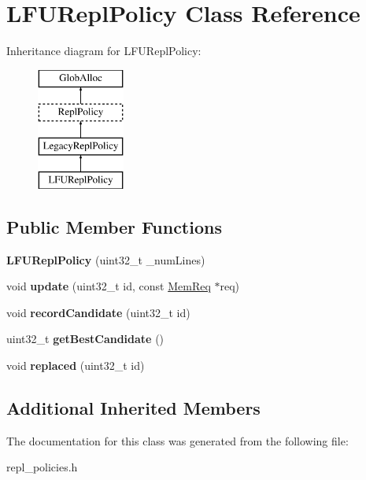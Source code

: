 \hypertarget{classLFUReplPolicy}{\section{L\-F\-U\-Repl\-Policy Class Reference}
\label{classLFUReplPolicy}
}
Inheritance diagram for L\-F\-U\-Repl\-Policy\-:\begin{figure}[H]
\begin{center}
\leavevmode
\includegraphics[height=4.000000cm]{classLFUReplPolicy}
\end{center}
\end{figure}
\subsection*{Public Member Functions}
\begin{DoxyCompactItemize}
\item 
\hypertarget{classLFUReplPolicy_a68506220223f68f0e1eb21c957b3ad94}{{\bfseries L\-F\-U\-Repl\-Policy} (uint32\-\_\-t \-\_\-num\-Lines)}\label{classLFUReplPolicy_a68506220223f68f0e1eb21c957b3ad94}

\item 
\hypertarget{classLFUReplPolicy_a50c8903887a1f03cb8cfb80e66ac7b6c}{void {\bfseries update} (uint32\-\_\-t id, const \hyperlink{structMemReq}{Mem\-Req} $\ast$req)}\label{classLFUReplPolicy_a50c8903887a1f03cb8cfb80e66ac7b6c}

\item 
\hypertarget{classLFUReplPolicy_a28c029e034077ddf59962c44e7c30533}{void {\bfseries record\-Candidate} (uint32\-\_\-t id)}\label{classLFUReplPolicy_a28c029e034077ddf59962c44e7c30533}

\item 
\hypertarget{classLFUReplPolicy_ae9d269e859d7cf85fdec6a070e4d4eb8}{uint32\-\_\-t {\bfseries get\-Best\-Candidate} ()}\label{classLFUReplPolicy_ae9d269e859d7cf85fdec6a070e4d4eb8}

\item 
\hypertarget{classLFUReplPolicy_aee2c951c5ea5d9f855466cbfef1f46bf}{void {\bfseries replaced} (uint32\-\_\-t id)}\label{classLFUReplPolicy_aee2c951c5ea5d9f855466cbfef1f46bf}

\end{DoxyCompactItemize}
\subsection*{Additional Inherited Members}


The documentation for this class was generated from the following file\-:\begin{DoxyCompactItemize}
\item 
repl\-\_\-policies.\-h\end{DoxyCompactItemize}
